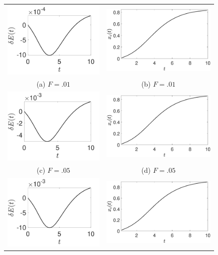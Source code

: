 \documentclass[a4paper,11pt]{article}
\begin{document}
\begin{figure}
\centering
\begin{tabular}{cc}
\includegraphics[width=.35\textwidth]{energy_wm_1_modu_pt9} &  \includegraphics[width=.35\textwidth]{com_wm_1_modu_pt9}\\
(a) $F=.01$ & (b) $F=.01$\\
\includegraphics[width=.35\textwidth]{energy_wm_5_modu_pt9} & \includegraphics[width=.35\textwidth]{com_wm_5_modu_pt9}\\
(c) $F=.05$ & (d) $F=.05$\\
 \includegraphics[width=.35\textwidth]{energy_wm_10_modu_pt9} & \includegraphics[width=.35\textwidth]{com_wm_10_modu_pt9}\\

\end{tabular}
\end{figure}
\end{document}
